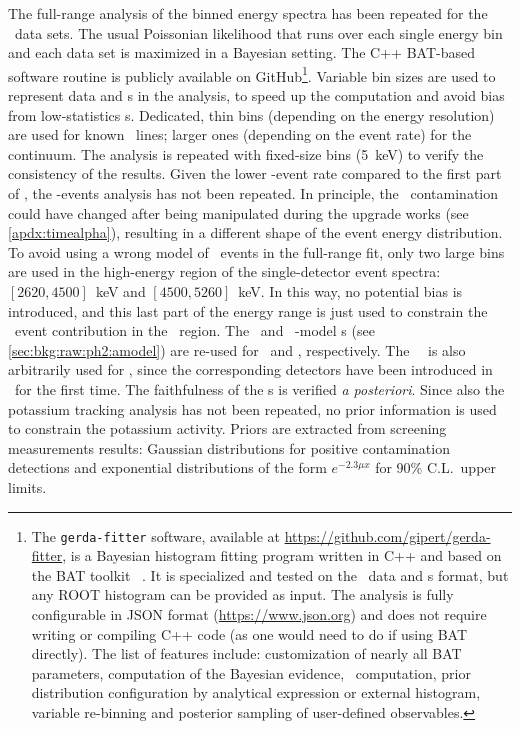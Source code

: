The full-range analysis of the binned energy spectra has been repeated for the \phasetwop\
data sets. The usual Poissonian likelihood that runs over each single energy bin and each
data set is maximized in a Bayesian setting. The C++ BAT-based~\cite{Caldwell2008}
software routine is publicly available on GitHub\footnote{\label{footnote:gerda-fitter}%
  The \texttt{gerda-fitter} software, available at
  \url{https://github.com/gipert/gerda-fitter}, is a Bayesian histogram fitting program
  written in C++ and based on the BAT toolkit \m{v1.0.0}~\cite{Beaujean2018}. It is
  specialized and tested on the \gerda\ data and \pdf{}s format, but any ROOT histogram can
  be provided as input. The analysis is fully configurable in JSON format
  (\url{https://www.json.org}) and does not require writing or compiling C++ code (as one
  would need to do if using BAT directly). The list of features include: customization of
  nearly all BAT parameters, computation of the Bayesian evidence, \pvalue\
  computation, prior distribution configuration by analytical expression or external
  histogram, variable re-binning and posterior sampling of user-defined observables.
}. Variable bin sizes are used to represent data and \pdf{}s in the analysis, to speed up the
computation and avoid bias from low-statistics \pdf{}s. Dedicated, thin bins (depending on
the energy resolution) are used for known \g\ lines; larger ones (depending on the event
rate) for the continuum. The analysis is repeated with fixed-size bins (5~keV) to verify
the consistency of the results.
\newpar
Given the lower \a-event rate compared to the first part of \phasetwo, the \a-events
analysis has not been repeated. In principle, the \Po\ contamination could have changed
after being manipulated during the upgrade works (see \cref{apdx:timealpha}), resulting in
a different shape of the event energy distribution. To avoid using a wrong model of \a\
events in the full-range fit, only two large bins are used in the high-energy region of
the single-detector event spectra: $[2620, 4500]$~keV and $[4500, 5260]$~keV. In this way,
no potential bias is introduced, and this last part of the energy range is just used to
constrain the \a\ event contribution in the \nnbb\ region. The \enrBEGeII\ and \enrCoaxII\
\a-model \pdf{}s (see \cref{sec:bkg:raw:ph2:amodel}) are re-used for \enrBEGeIIp\ and
\enrSCoaxIIp, respectively. The \enrBEGeII\ \pdf\ is also arbitrarily used for \enrICoaxIIp,
since the corresponding detectors have been introduced in \phasetwop\ for the first time.
The faithfulness of the \pdf{}s is verified \emph{a posteriori}.
\newpar
Since also the potassium tracking analysis has not been repeated, no prior information is
used to constrain the potassium activity. Priors are extracted from screening
measurements results: Gaussian distributions for positive contamination detections and
exponential distributions of the form $e^{-2.3 \mu x}$ for 90\% C.L.~upper limits.

